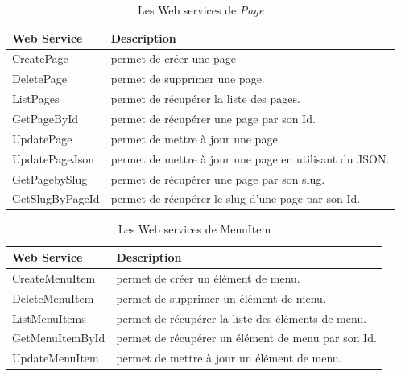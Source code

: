 \begin{table}[H]
    \centering
    \begin{tabular}{|m{5cm}|m{10cm}|}
        \hline
        \textbf{Web Service} & \textbf{Description}                                   \\
        \hline
        CreatePage           & permet de créer une page                               \\
        \hline
        DeletePage           & permet de supprimer une page.                          \\
        \hline
        ListPages            & permet de récupérer la liste des pages.                \\
        \hline
        GetPageById          & permet de récupérer une page par son Id.               \\
        \hline
        UpdatePage           & permet de mettre à jour une page.                      \\
        \hline
        UpdatePageJson       & permet de mettre à jour une page en utilisant du JSON. \\
        \hline
        GetPagebySlug        & permet de récupérer une page par son slug.             \\
        \hline
        GetSlugByPageId      & permet de récupérer le slug d'une page par son Id.     \\
        \hline
    \end{tabular}
    \caption{Les Web services de \textit{Page}}
    \label{tab:my_label}
\end{table}





\begin{table}[H]
    \centering
    \begin{tabular}{|m{5cm}|m{10cm}|}
        \hline
        \textbf{Web Service} & \textbf{Description}                               \\
        \hline
        CreateMenuItem       & permet de créer un élément de menu.                \\
        \hline
        DeleteMenuItem       & permet de supprimer un élément de menu.            \\
        \hline
        ListMenuItems        & permet de récupérer la liste des éléments de menu. \\
        \hline
        GetMenuItemById      & permet de récupérer un élément de menu par son Id. \\
        \hline
        UpdateMenuItem       & permet de mettre à jour un élément de menu.        \\
        \hline
    \end{tabular}
    \caption{Les Web services de MenuItem}
    \label{tab:my_label}
\end{table}







